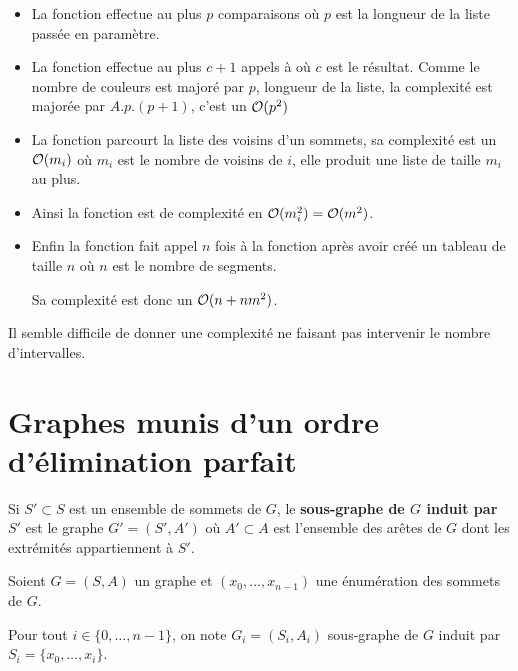 \begin{Answer}
\begin{itemize}
\item La fonction  effectue au plus $p$ comparaisons où $p$ est la longueur de la liste passée en paramètre.
\item La fonction  effectue au plus $c+1$ appels à  où $c$ est le résultat. Comme le nombre de couleurs est majoré par $p$, longueur de la liste, la complexité est majorée par $A.p.(p+1)$, c'est un ${\cal O}(p^2)$

\item La fonction  parcourt la liste des voisins d'un sommets, sa complexité est un ${\cal O}(m_i)$ où $m_i$ est le nombre de voisins de $i$, elle produit une liste de taille $m_i$ au plus.

\item Ainsi la fonction  est de complexité en ${\cal O}(m_i^2)={\cal O}(m^2)$.

\item Enfin la fonction  fait appel $n$ fois à la fonction  après avoir créé un tableau de taille $n$ où $n$ est le nombre de segments.

Sa complexité est donc un ${\cal O}(n + nm^2)$.
\end{itemize}

Il  semble difficile de donner une complexité ne faisant pas intervenir le nombre d'intervalles.
\end{Answer}
\section{Graphes munis d'un ordre d'élimination parfait}
Si $S'\subset S$ est un ensemble de sommets de $G$, le {\bf sous-graphe de $G$ induit par $S'$} est le
graphe $G' = (S',A')$ où $A'\subset A$ est l'ensemble des arêtes de $G$ dont les extrémités appartiennent à $S'$.

Soient $G = (S, A)$ un graphe et $(x_0,\dots,x_{n-1})$ une énumération
des sommets de $G$. 

Pour tout $i\in \{0,\dots,n-1\}$, on note $G_i=(S_i,A_i)$ sous-graphe de $G$ induit par $S_i=\{x_0,\dots,x_i\}$.


